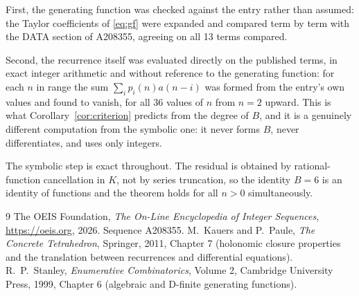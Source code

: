 \documentclass[11pt,a4paper]{article}
\theoremstyle{plain}
\theoremstyle{definition}
\begin{document}
First, the generating function was checked against the entry rather than assumed: the
Taylor coefficients of \eqref{eq:gf} were expanded and compared term by term with the DATA
section of A208355, agreeing on all 13 terms compared.

Second, the recurrence itself was evaluated directly on the published terms, in exact
integer arithmetic and without reference to the generating function: for each $n$ in range
the sum $\sum_{i}p_{i}(n)a(n-i)$ was formed from the entry's own values and found to
vanish, for all 36 values of $n$ from $n=2$ upward. This is what
Corollary~\ref{cor:criterion} predicts from the degree of $B$, and it is a genuinely
different computation from the symbolic one: it never forms $B$, never differentiates, and
uses only integers.

The symbolic step is exact throughout. The residual is obtained by rational-function
cancellation in $K$, not by series truncation, so the identity $B=6$ is an
identity of functions and the theorem holds for all $n>0$ simultaneously.

\begin{thebibliography}{9}
 The OEIS Foundation, \emph{The On-Line Encyclopedia of Integer Sequences},
\url{https://oeis.org}, 2026. Sequence A208355.
 M.~Kauers and P.~Paule, \emph{The Concrete Tetrahedron}, Springer, 2011,
Chapter 7 (holonomic closure properties and the translation between recurrences and
differential equations).
 R.~P.~Stanley, \emph{Enumerative Combinatorics}, Volume 2, Cambridge
University Press, 1999, Chapter 6 (algebraic and D-finite generating functions).
\end{thebibliography}
\end{document}
